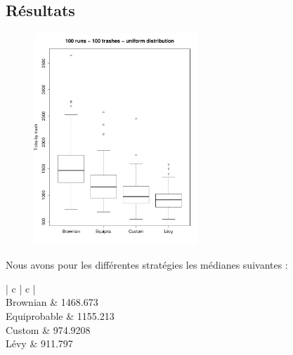 \subsection{Résultats}

\begin{figure}[H]
	\begin{center}
		\includegraphics[height=8cm]{diagrams/100TrRnd_all.pdf}
		\caption{}
		\label{fig:100Trashes_Rnd}
	\end{center}
\end{figure}

Nous avons pour les différentes stratégies les médianes suivantes :

\begin{tabular}{ | c | c | }
	\hline
	 \\
	\hline
	Brownian & 1468.673 \\
	Equiprobable & 1155.213 \\
	Custom & 974.9208 \\
	Lévy & 911.797 \\
	\hline
\end{tabular}
